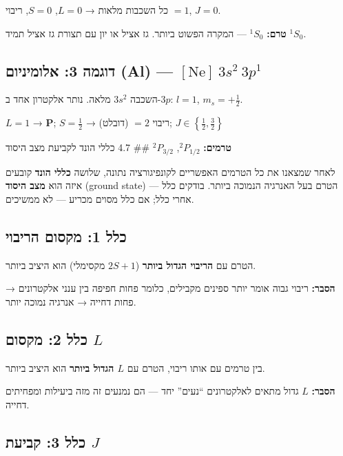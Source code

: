 \documentclass[
  hebrew,
  letterpaper,
  DIV=11,
  numbers=noendperiod]{scrreprt}
\begin{document}
כל השכבות מלאות → \(L=0\), \(S=0\), ריבוי \(=1\), \(J=0\).

\textbf{טרם:} \(^1S_0\) --- המקרה הפשוט ביותר. גז אציל או יון עם תצורת
גז אציל תמיד \(^1S_0\).

\subsection{\texorpdfstring{דוגמה 3: אלומיניום (Al) ---
\([\text{Ne}]\ 3s^2\ 3p^1\)}{דוגמה 3: אלומיניום (Al) --- {[}\textbackslash text\{Ne\}{]}\textbackslash{} 3s\^{}2\textbackslash{} 3p\^{}1}}\label{ux5d3ux5d5ux5d2ux5deux5d4-3-ux5d0ux5dcux5d5ux5deux5d9ux5e0ux5d9ux5d5ux5dd-al-textne-3s2-3p1}

השכבה \(3s^2\) מלאה. נותר אלקטרון אחד ב-\(3p\): \(l=1\),
\(m_s=+\frac{1}{2}\).

\(L=1\) → \textbf{P}; \(S=\frac{1}{2}\) → ריבוי \(=2\) (דובלט);
\(J \in \left\{\frac{1}{2}, \frac{3}{2}\right\}\)

\textbf{טרמים:} \(^2P_{1/2}\), \(^2P_{3/2}\) \#\# 4.7 כללי הונד לקביעת
מצב היסוד

לאחר שמצאנו את כל הטרמים האפשריים לקונפיגורציה נתונה, שלושה \textbf{כללי
הונד} קובעים איזה הוא \textbf{מצב היסוד} (ground state) --- הטרם בעל
האנרגיה הנמוכה ביותר. בודקים כלל אחרי כלל; אם כלל מסוים מכריע --- לא
ממשיכים.

\subsection{כלל 1: מקסום
הריבוי}\label{ux5dbux5dcux5dc-1-ux5deux5e7ux5e1ux5d5ux5dd-ux5d4ux5e8ux5d9ux5d1ux5d5ux5d9}

הטרם עם \textbf{הריבוי הגדול ביותר} (\(2S+1\) מקסימלי) הוא היציב ביותר.

\textbf{הסבר:} ריבוי גבוה אומר יותר ספינים מקבילים, כלומר פחות חפיפה בין
ענני אלקטרונים → פחות דחייה → אנרגיה נמוכה יותר.

\subsection{\texorpdfstring{כלל 2: מקסום
\(L\)}{כלל 2: מקסום L}}\label{ux5dbux5dcux5dc-2-ux5deux5e7ux5e1ux5d5ux5dd-l}

בין טרמים עם אותו ריבוי, הטרם עם \textbf{\(L\) הגדול ביותר} הוא היציב
ביותר.

\textbf{הסבר:} \(L\) גדול מתאים לאלקטרונים ``נעים'' יחד --- הם נמנעים זה
מזה ביעילות ומפחיתים דחייה.

\subsection{\texorpdfstring{כלל 3: קביעת
\(J\)}{כלל 3: קביעת J}}\label{ux5dbux5dcux5dc-3-ux5e7ux5d1ux5d9ux5e2ux5ea-j}
\end{document}
